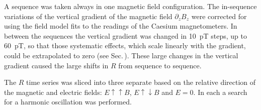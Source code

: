 


A sequence was taken always in one magnetic field configuration. The in-sequence variations of the vertical gradient of the magnetic field $\partial_z B_z$ were corrected for using the field model fits to the readings of the Caesium magnetometers. In between the sequences the vertical gradient was changed in \SI{10}{\pico\tesla} steps, up to \SI{60}{\pico\tesla}, so that those systematic effects, which scale linearly with the gradient, could be extrapolated to zero (see Sec.\,\label{sec:measurement_procedure}). These large changes in the vertical gradient caused the large shifts in $R$ from sequence to sequence.

The $R$ time series was sliced into three separate based on the relative direction of the magnetic and electric fields: $E \uparrow \uparrow B$, $E \uparrow \downarrow B$ and $E=0$. In each a search for a harmonic oscillation was performed.


